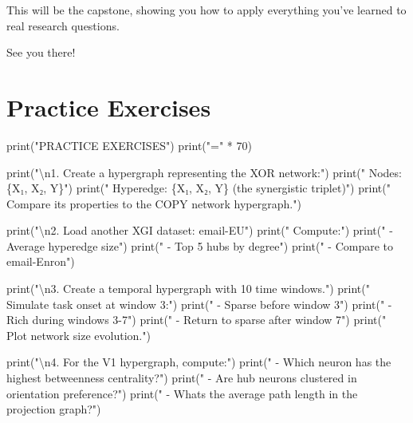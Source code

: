 \documentclass[
  11pt,
  letterpaper,
  oneside,
  openany]{book}
\newenvironment{Shaded}{\begin{snugshade}}{\end{snugshade}}
\newcommand{\BuiltInTok}[1]{\textcolor[rgb]{0.00,0.23,0.31}{#1}}
\newcommand{\CharTok}[1]{\textcolor[rgb]{0.13,0.47,0.30}{#1}}
\newcommand{\DecValTok}[1]{\textcolor[rgb]{0.68,0.00,0.00}{#1}}
\newcommand{\NormalTok}[1]{\textcolor[rgb]{0.00,0.23,0.31}{#1}}
\newcommand{\OperatorTok}[1]{\textcolor[rgb]{0.37,0.37,0.37}{#1}}
\newcommand{\StringTok}[1]{\textcolor[rgb]{0.13,0.47,0.30}{#1}}
\begin{document}
This will be the capstone, showing you how to apply everything you've
learned to real research questions.

See you there! 🚀

\section{Practice Exercises}\label{practice-exercises-3}

\begin{Shaded}
\begin{Highlighting}[]
\BuiltInTok{print}\NormalTok{(}\StringTok{"PRACTICE EXERCISES"}\NormalTok{)}
\BuiltInTok{print}\NormalTok{(}\StringTok{"="} \OperatorTok{*} \DecValTok{70}\NormalTok{)}

\BuiltInTok{print}\NormalTok{(}\StringTok{"}\CharTok{\textbackslash{}n}\StringTok{1. Create a hypergraph representing the XOR network:"}\NormalTok{)}
\BuiltInTok{print}\NormalTok{(}\StringTok{"   Nodes: \{X₁, X₂, Y\}"}\NormalTok{)}
\BuiltInTok{print}\NormalTok{(}\StringTok{"   Hyperedge: \{X₁, X₂, Y\} (the synergistic triplet)"}\NormalTok{)}
\BuiltInTok{print}\NormalTok{(}\StringTok{"   Compare its properties to the COPY network hypergraph."}\NormalTok{)}

\BuiltInTok{print}\NormalTok{(}\StringTok{"}\CharTok{\textbackslash{}n}\StringTok{2. Load another XGI dataset: \textquotesingle{}email{-}EU\textquotesingle{}"}\NormalTok{)}
\BuiltInTok{print}\NormalTok{(}\StringTok{"   Compute:"}\NormalTok{)}
\BuiltInTok{print}\NormalTok{(}\StringTok{"   {-} Average hyperedge size"}\NormalTok{)}
\BuiltInTok{print}\NormalTok{(}\StringTok{"   {-} Top 5 hubs by degree"}\NormalTok{)}
\BuiltInTok{print}\NormalTok{(}\StringTok{"   {-} Compare to email{-}Enron"}\NormalTok{)}

\BuiltInTok{print}\NormalTok{(}\StringTok{"}\CharTok{\textbackslash{}n}\StringTok{3. Create a temporal hypergraph with 10 time windows."}\NormalTok{)}
\BuiltInTok{print}\NormalTok{(}\StringTok{"   Simulate \textquotesingle{}task onset\textquotesingle{} at window 3:"}\NormalTok{)}
\BuiltInTok{print}\NormalTok{(}\StringTok{"   {-} Sparse before window 3"}\NormalTok{)}
\BuiltInTok{print}\NormalTok{(}\StringTok{"   {-} Rich during windows 3{-}7"}\NormalTok{)}
\BuiltInTok{print}\NormalTok{(}\StringTok{"   {-} Return to sparse after window 7"}\NormalTok{)}
\BuiltInTok{print}\NormalTok{(}\StringTok{"   Plot network size evolution."}\NormalTok{)}

\BuiltInTok{print}\NormalTok{(}\StringTok{"}\CharTok{\textbackslash{}n}\StringTok{4. For the V1 hypergraph, compute:"}\NormalTok{)}
\BuiltInTok{print}\NormalTok{(}\StringTok{"   {-} Which neuron has the highest betweenness centrality?"}\NormalTok{)}
\BuiltInTok{print}\NormalTok{(}\StringTok{"   {-} Are hub neurons clustered in orientation preference?"}\NormalTok{)}
\BuiltInTok{print}\NormalTok{(}\StringTok{"   {-} What\textquotesingle{}s the average path length in the projection graph?"}\NormalTok{)}


\end{Highlighting}
\end{Shaded}
\end{document}
